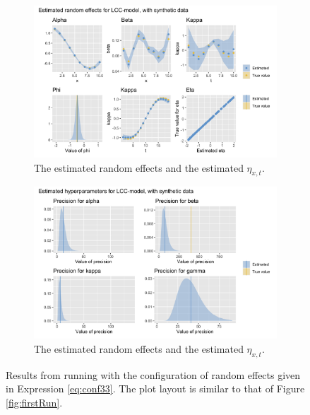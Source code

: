 \begin{figure}[h!]
    \centering
    \begin{subfigure}[b]{0.85\textwidth}
        \centering
        \includegraphics[width=\textwidth]{synthetic-data/Figures/effects-LCC-synthetic-3-3.png}
        \caption{The estimated random effects and the estimated $\eta_{x,t}$.}
    \end{subfigure}
    
    \begin{subfigure}[b]{0.6\textwidth}
        \centering
        \includegraphics[width=\textwidth]{synthetic-data/Figures/hyperparameters-LCC-synthetic-3-3.png}
        \caption{The estimated random effects and the estimated $\eta_{x,t}$.}
    \end{subfigure}
    \caption{Results from running \inlabru with the configuration of random effects given in Expression \ref{eq:conf33}. The plot layout is similar to that of Figure \ref{fig:firstRun}.}
    \label{fig:conf33}
\end{figure}
